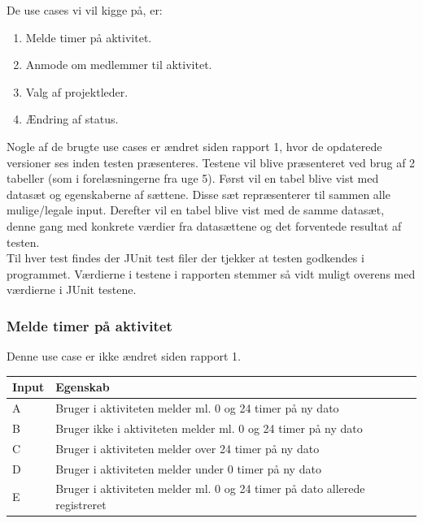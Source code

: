 De use cases vi vil kigge på, er:
\begin{enumerate}
    \item Melde timer på aktivitet.
    \item Anmode om medlemmer til aktivitet.
    \item Valg af projektleder.
    \item Ændring af status.
\end{enumerate} 
\vspace{3mm}

Nogle af de brugte use cases er ændret siden rapport 1, hvor de opdaterede versioner ses inden testen præsenteres. Testene vil blive præsenteret ved brug af 2 tabeller (som i forelæsningerne fra uge 5). Først vil en tabel blive vist med datasæt og egenskaberne af sættene. Disse sæt repræsenterer til sammen alle mulige/legale input. Derefter vil en tabel blive vist med de samme datasæt, denne gang med konkrete værdier fra datasættene og det forventede resultat af testen. \\

Til hver test findes der JUnit test filer der tjekker at testen godkendes i programmet. Værdierne i testene i rapporten stemmer så vidt muligt overens med værdierne i JUnit testene. \\

\subsubsection{Melde timer på aktivitet}

Denne use case er ikke ændret siden rapport 1.

\begin{table}[H]
    \centering
    \begin{tabular}{|l|l|}
    \hline
    \textbf{Input} & \textbf{Egenskab}                                                                   \\ \hline
 A     & Bruger i aktiviteten melder  ml. 0 og 24 timer på ny dato                   \\ \hline
    B     & Bruger ikke i aktiviteten melder ml. 0 og 24 timer på ny dato               \\ \hline
    C     & Bruger i aktiviteten melder over 24 timer på ny dato                        \\ \hline
    D     & Bruger i aktiviteten melder under 0 timer på ny dato                        \\ \hline
    E     & Bruger i aktiviteten melder ml. 0 og 24 timer på dato allerede registreret  \\ \hline
    \end{tabular}
\end{table}

